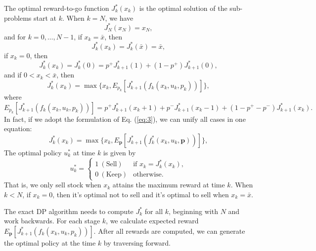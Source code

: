 \documentclass[11pt]{article}
\begin{document}
\begin{enumerate}[label=(\alph*)]
    The optimal reward-to-go function $J_k^*(x_k)$ is the optimal solution of the sub-problems start at $k$.
    When $k = N$, we have
    \[
    J_N^*(x_N) = x_N,
    \]
    and for $k = 0, \dots, N-1$, if $x_k = \bar x$, then
    \[
    J_k^*(x_k) = J_k^*(\bar x) = \bar x,
    \]
    if $x_k = 0$, then
    \[
    J_k^*(x_k) = J_k^*(0) = p^+J^*_{k+1}(1) + (1-p^+)J^*_{k+1}(0),
    \]
    and if $0 < x_k < \bar x$, then
    \begin{equation}\label{eq:4}
       J_k^*(x_k) = \max \{x_k, E_{p_k}[J^*_{k+1}(f_k(x_k, u_k, p_k))]\},
    \end{equation}
    where
    \[
    E_{p_k}[J^*_{k+1}(f_k(x_k, u_k, p_k))] = p^+J^*_{k+1}(x_k + 1) + p^-J^*_{k+1}(x_k - 1) + (1-p^+-p^-)J^*_{k+1}(x_k).
    \]
    In fact, if we adopt the formulation of Eq. (\ref{eq:3}), we can unify all cases in one equation: 
    \begin{equation}\label{eq:5}
       J_k^*(x_k) = \max \{x_k, E_{\boldsymbol p}[J^*_{k+1}(f^*_k(x_k, u_k, \boldsymbol p))]\},
    \end{equation}
    The optimal policy $u^*_k$ at time $k$ is given by
    \[
    u^*_k = \begin{cases}
        1 ~(\text{Sell})& \text{if } x_k = J_k^*(x_k),\\
        0 ~(\text{Keep}) & \text{otherwise}.
    \end{cases}
    \]
    That is, we only sell stock when $x_k$ attains the maximum reward at time $k$. When $k < N$, if $x_k = 0$, then it's optimal not to sell and it's optimal to sell when $x_k = \bar x$.

    The exact DP algorithm needs to compute $J_k^*$ for all $k$, beginning with $N$ and work backwards. For each stage $k$, we calculate expected reward $E_{\boldsymbol p}[J^*_{k+1}(f_k(x_k, u_k, p_k))]$. After all rewards are computed, we can generate the optimal policy at the time $k$ by traversing forward.
    

\end{enumerate}
\end{document}
